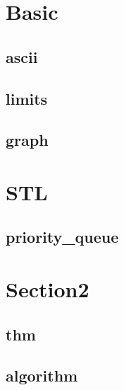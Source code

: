 \section{Basic}
    \subsection{ascii}
        
    \subsection{limits}
        
    \subsection{graph}
        

\section{STL}
    \subsection{priority\_queue}
        

\section{Section2}
    \subsection{thm}
        
    \subsection{algorithm}
        